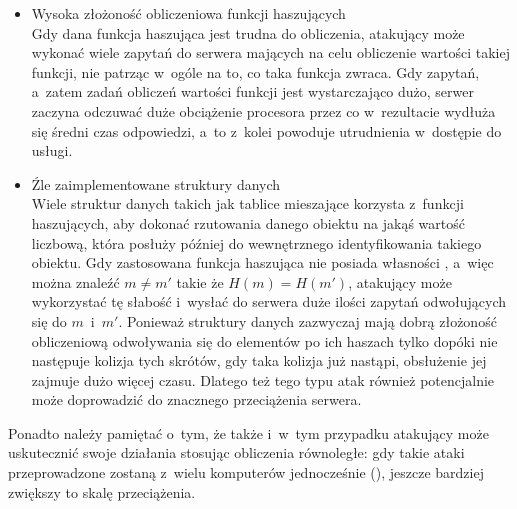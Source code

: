 \begin{itemize}

    \item Wysoka złożoność obliczeniowa funkcji haszujących \\
    Gdy dana funkcja haszująca jest trudna do obliczenia, atakujący może
    wykonać wiele zapytań do serwera mających na celu obliczenie wartości
    takiej funkcji, nie patrząc w~ogóle na to, co taka funkcja zwraca. Gdy
    zapytań, a~zatem zadań obliczeń wartości funkcji jest wystarczająco dużo,
    serwer zaczyna odczuwać duże obciążenie procesora przez co w~rezultacie
    wydłuża się średni czas odpowiedzi, a~to z~kolei powoduje utrudnienia
    w~dostępie do usługi.

    \item Źle zaimplementowane struktury danych \\
    Wiele struktur danych takich jak tablice mieszające korzysta z~funkcji
    haszujących, aby dokonać rzutowania danego obiektu na jakąś wartość
    liczbową, która posłuży później do wewnętrznego identyfikowania takiego
    obiektu. Gdy zastosowana funkcja haszująca nie posiada własności
    , a~więc można znaleźć $m \neq m'$ takie że $H(m)
    = H(m')$, atakujący może wykorzystać tę słabość i~wysłać do serwera duże
    ilości zapytań odwołujących się do $m$~i~$m'$. Ponieważ struktury danych
    zazwyczaj mają dobrą złożoność obliczeniową odwoływania się do elementów po
    ich haszach tylko dopóki nie następuje kolizja tych skrótów, gdy taka
    kolizja już nastąpi, obsłużenie jej zajmuje dużo więcej czasu. Dlatego też
    tego typu atak również potencjalnie może doprowadzić do znacznego
    przeciążenia serwera.

\end{itemize}

Ponadto należy pamiętać o~tym, że także i~w~tym przypadku atakujący może
uskutecznić swoje działania stosując obliczenia równoległe: gdy takie ataki
przeprowadzone zostaną z~wielu komputerów jednocześnie (), jeszcze bardziej zwiększy to skalę przeciążenia.
